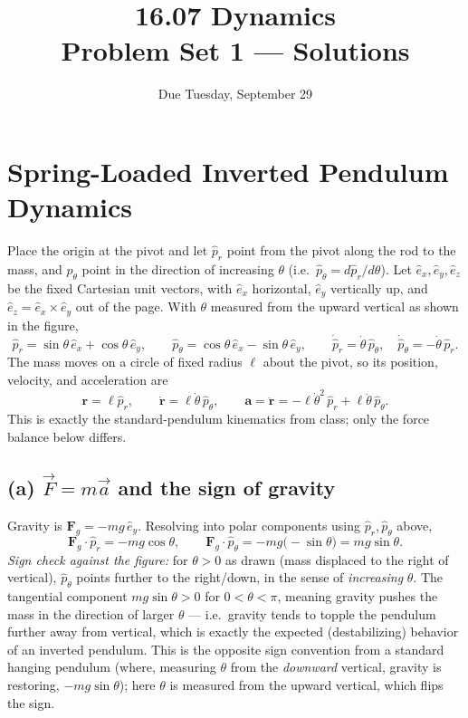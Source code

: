 \documentclass[11pt]{article}
\title{16.07 Dynamics\\Problem Set 1 --- Solutions}
\author{Due Tuesday, September 29}
\date{}
\newcommand{\thd}{\dot\theta}
\newcommand{\thdd}{\ddot\theta}
\begin{document}
\maketitle

\section{Spring-Loaded Inverted Pendulum Dynamics}

Place the origin at the pivot and let $\hat p_r$ point from the pivot along the rod to the mass, and $\hat p_\theta$ point in the direction of increasing $\theta$ (i.e.\ $\hat p_\theta = d\hat p_r/d\theta$). Let $\hat e_x,\hat e_y,\hat e_z$ be the fixed Cartesian unit vectors, with $\hat e_x$ horizontal, $\hat e_y$ vertically up, and $\hat e_z=\hat e_x\times\hat e_y$ out of the page. With $\theta$ measured from the upward vertical as shown in the figure,
\[
  \hat p_r = \sin\theta\,\hat e_x + \cos\theta\,\hat e_y,\qquad
  \hat p_\theta = \cos\theta\,\hat e_x - \sin\theta\,\hat e_y,\qquad
  \dot{\hat p}_r = \thd\,\hat p_\theta,\quad \dot{\hat p}_\theta = -\thd\,\hat p_r .
\]
The mass moves on a circle of fixed radius $\ell$ about the pivot, so its position, velocity, and acceleration are
\[
  \mathbf r = \ell\hat p_r,\qquad
  \dot{\mathbf r} = \ell\thd\,\hat p_\theta,\qquad
  \mathbf a = \ddot{\mathbf r} = -\ell\thd^2\,\hat p_r + \ell\thdd\,\hat p_\theta .
\]
This is exactly the standard-pendulum kinematics from class; only the force balance below differs.

\subsection*{(a) $\vec F=m\vec a$ and the sign of gravity}
Gravity is $\mathbf F_g = -mg\,\hat e_y$. Resolving into polar components using $\hat p_r,\hat p_\theta$ above,
\[
  \mathbf F_g\cdot\hat p_r = -mg\cos\theta,
  \qquad
  \mathbf F_g\cdot\hat p_\theta = -mg\big(-\sin\theta\big)= mg\sin\theta .
\]
\emph{Sign check against the figure:} for $\theta>0$ as drawn (mass displaced to the right of vertical), $\hat p_\theta$ points further to the right/down, in the sense of \emph{increasing} $\theta$. The tangential component $mg\sin\theta>0$ for $0<\theta<\pi$, meaning gravity pushes the mass in the direction of larger $\theta$ --- i.e.\ gravity tends to topple the pendulum further away from vertical, which is exactly the expected (destabilizing) behavior of an inverted pendulum. This is the opposite sign convention from a standard hanging pendulum (where, measuring $\theta$ from the \emph{downward} vertical, gravity is restoring, $-mg\sin\theta$); here $\theta$ is measured from the upward vertical, which flips the sign.
\end{document}
